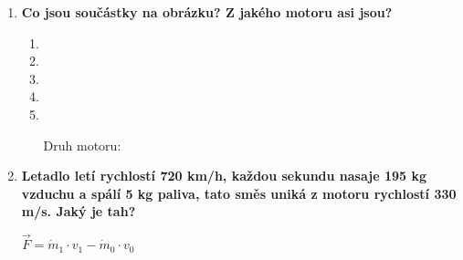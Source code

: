 \documentclass[../main.tex]{subfiles}
\begin{document}
\begin{enumerate}[label={\textbf{\arabic*.}}, resume]

    \item \textbf{Co jsou součástky na obrázku? Z jakého motoru asi jsou?}
        \begin{enumerate}[label={\arabic*.}, wide=0pt]
        \item {}\tecky{5.3cm}
        \item {}\tecky{5.3cm}
        \item {}\tecky{5.3cm}
        \item {}\tecky{5.3cm}
        \item {}\tecky{5.3cm}
        \item[Druh motoru:]\tecky{3cm}
    \end{enumerate}

    \item \textbf{Letadlo letí rychlostí 720 km/h, každou sekundu nasaje 195 kg vzduchu a spálí 5 kg paliva, tato směs uniká z motoru rychlostí 330 m/s. Jaký je tah?}
    \vspace{-0.75cm}
    \begin{flushright}
        \begin{minipage}{0.25\textwidth}
            \begin{tcolorbox}[colframe=black, colback=white, boxrule=0.6pt]
                {\(\vec{F}=\dot{m}_{1}\cdot{v_1}-\dot{m}_{0}\cdot{v_0}\)}
            \end{tcolorbox}
        \end{minipage}
    \end{flushright}


\end{enumerate}
\end{document}
